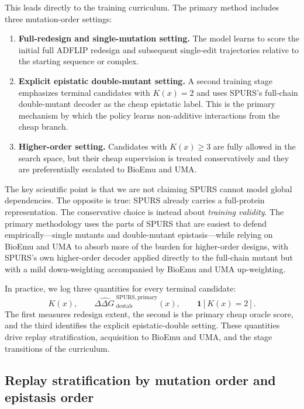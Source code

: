 \documentclass[11pt]{article}
\newcommand{\ddG}{\ensuremath{\Delta\Delta G \ }}
\begin{document}
	This leads directly to the training curriculum. The primary method includes three mutation-order settings:
	\begin{enumerate}[leftmargin=1.5em]
		\item \textbf{Full-redesign and single-mutation setting.} The model learns to score the initial full ADFLIP redesign and subsequent single-edit trajectories relative to the starting sequence or complex.
		\item \textbf{Explicit epistatic double-mutant setting.} A second training stage emphasizes terminal candidates with $K(x)=2$ and uses SPURS's full-chain double-mutant decoder as the cheap epistatic label. This is the primary mechanism by which the policy learns non-additive interactions from the cheap branch.
		\item \textbf{Higher-order setting.} Candidates with $K(x)\ge 3$ are fully allowed in the search space, but their cheap supervision is treated conservatively and they are preferentially escalated to BioEmu and UMA. 
	\end{enumerate}
	
	The key scientific point is that we are not claiming SPURS cannot model global dependencies. The opposite is true: SPURS already carries a full-protein representation. The conservative choice is instead about \emph{training validity}. The primary methodology uses the parts of SPURS that are easiest to defend empirically---single mutants and double-mutant epistasis---while relying on BioEmu and UMA to absorb more of the burden for higher-order designs, with SPURS's own higher-order decoder applied directly to the full-chain mutant but with a mild down-weighting accompanied by BioEmu and UMA up-weighting.
	
	In practice, we log three quantities for every terminal candidate:
	\begin{equation}
		K(x),\qquad \widehat{\ddG}^{\mathrm{SPURS,primary}}_{\mathrm{destab}}(x),\qquad \mathbf{1}[K(x)=2].
	\end{equation}
	The first measures redesign extent, the second is the primary cheap oracle score, and the third identifies the explicit epistatic-double setting. These quantities drive replay stratification, acquisition to BioEmu and UMA, and the stage transitions of the curriculum.
	
	
	
	\subsection{Replay stratification by mutation order and epistasis order}
	
\end{document}
